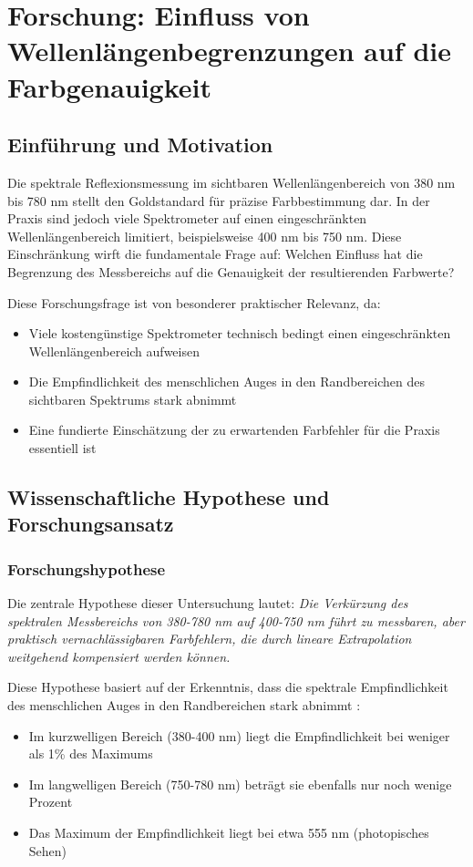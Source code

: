 \chapter{Forschung: Einfluss von Wellenlängenbegrenzungen auf die Farbgenauigkeit}

\section{Einführung und Motivation}

Die spektrale Reflexionsmessung im sichtbaren Wellenlängenbereich von 380 nm bis 780 nm stellt den Goldstandard für präzise Farbbestimmung dar. In der Praxis sind jedoch viele Spektrometer auf einen eingeschränkten Wellenlängenbereich limitiert, beispielsweise 400 nm bis 750 nm. Diese Einschränkung wirft die fundamentale Frage auf: Welchen Einfluss hat die Begrenzung des Messbereichs auf die Genauigkeit der resultierenden Farbwerte?

Diese Forschungsfrage ist von besonderer praktischer Relevanz, da:
\begin{itemize}
    \item Viele kostengünstige Spektrometer technisch bedingt einen eingeschränkten Wellenlängenbereich aufweisen
    \item Die Empfindlichkeit des menschlichen Auges in den Randbereichen des sichtbaren Spektrums stark abnimmt
    \item Eine fundierte Einschätzung der zu erwartenden Farbfehler für die Praxis essentiell ist
\end{itemize}

\section{Wissenschaftliche Hypothese und Forschungsansatz}

\subsection{Forschungshypothese}

Die zentrale Hypothese dieser Untersuchung lautet: \textit{Die Verkürzung des spektralen Messbereichs von 380-780 nm auf 400-750 nm führt zu messbaren, aber praktisch vernachlässigbaren Farbfehlern, die durch lineare Extrapolation weitgehend kompensiert werden können.}

Diese Hypothese basiert auf der Erkenntnis, dass die spektrale Empfindlichkeit des menschlichen Auges in den Randbereichen stark abnimmt \parencite{CIE15:2018}:
\begin{itemize}
    \item Im kurzwelligen Bereich (380-400 nm) liegt die Empfindlichkeit bei weniger als 1\% des Maximums
    \item Im langwelligen Bereich (750-780 nm) beträgt sie ebenfalls nur noch wenige Prozent
    \item Das Maximum der Empfindlichkeit liegt bei etwa 555 nm (photopisches Sehen)
\end{itemize}


